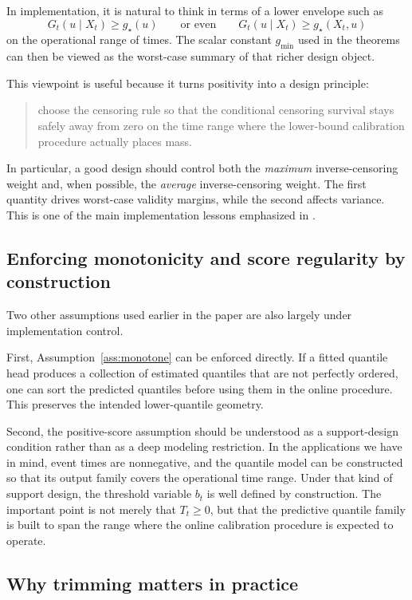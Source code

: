 \documentclass[11pt]{article}
\newcommand{\1}{\mathbf{1}}
\begin{document}
In implementation, it is natural to think in terms of a lower envelope such as
\[
G_t(u\mid X_t)\ge g_\star(u)
\qquad\text{or even}\qquad
G_t(u\mid X_t)\ge g_\star(X_t,u)
\]
on the operational range of times. The scalar constant $g_{\min}$ used in the theorems can then be viewed as the worst-case summary of that richer design object.

This viewpoint is useful because it turns positivity into a design principle:
\begin{quote}
choose the censoring rule so that the conditional censoring survival stays safely away from zero on the time range where the lower-bound calibration procedure actually places mass.
\end{quote}
In particular, a good design should control both the \emph{maximum} inverse-censoring weight and, when possible, the \emph{average} inverse-censoring weight. The first quantity drives worst-case validity margins, while the second affects variance. This is one of the main implementation lessons emphasized in \citet{Davidov2025}.

\subsection{Enforcing monotonicity and score regularity by construction}

Two other assumptions used earlier in the paper are also largely under implementation control.

First, Assumption~\ref{ass:monotone} can be enforced directly. If a fitted quantile head produces a collection of estimated quantiles that are not perfectly ordered, one can sort the predicted quantiles before using them in the online procedure. This preserves the intended lower-quantile geometry.

Second, the positive-score assumption should be understood as a support-design condition rather than as a deep modeling restriction. In the applications we have in mind, event times are nonnegative, and the quantile model can be constructed so that its output family covers the operational time range. Under that kind of support design, the threshold variable $b_t$ is well defined by construction. The important point is not merely that $T_t\ge 0$, but that the predictive quantile family is built to span the range where the online calibration procedure is expected to operate.

\subsection{Why trimming matters in practice}
\end{document}
